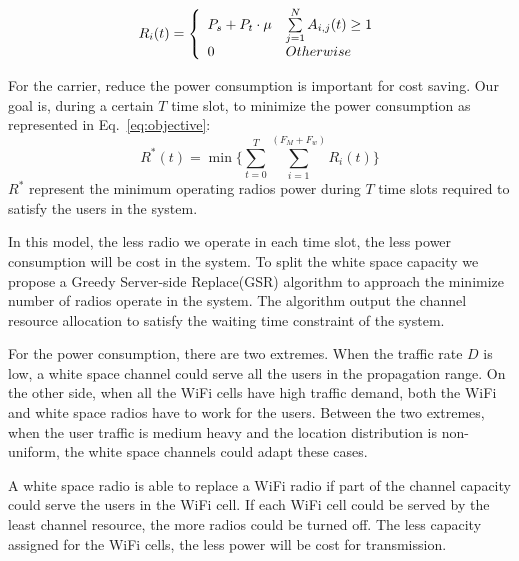 \begin{equation}
\label{eq:radio}
 R_i(t) = \left\{ 
	  \begin{array}{l l}
	    P_s+P_t\cdot\mu   &  \sum\limits_{j=1}^N A_{i,j}(t) \ge 1\\
		0 &  Otherwise
			    \end{array} \right.
\end{equation}


For the carrier, reduce the power consumption is important for cost saving.
Our goal is, during a certain $T$ time slot, to minimize the power consumption as represented in Eq.~\ref{eq:objective}:
\begin{equation}
\label{eq:objective}
R^*(t) = \min{\{\sum\limits_{t=0}^{T}\sum\limits_{i=1}^{(F_M+F_w)} R_{i}}(t)\}
\end{equation}
$R^*$ represent the minimum operating radios power during $T$ time slots required to satisfy the 
users in the system. 

In this model, the less radio we operate in each time slot, the less power consumption will be cost in the system.
To split the white space capacity we propose a Greedy Server-side Replace(GSR) algorithm to approach the minimize 
number of radios operate in the system. The algorithm output the channel resource allocation to satisfy the waiting 
time constraint of the system.


For the power consumption, there are two extremes. When the traffic rate $D$ is low, a white space channel could 
serve all the users in the propagation range. On the other side, when all the WiFi cells have high traffic demand, 
both the WiFi and white space radios have to work for the users. Between the two extremes, when the user traffic 
is medium heavy and the location distribution is non-uniform, the white space channels could adapt these cases.

A white space radio is able to replace a WiFi radio if part of the channel capacity could serve the users in the 
WiFi cell. If each WiFi cell could be served by the least channel resource, the more radios could be turned off. 
The less capacity assigned for the WiFi cells, the less power will be cost for transmission.

